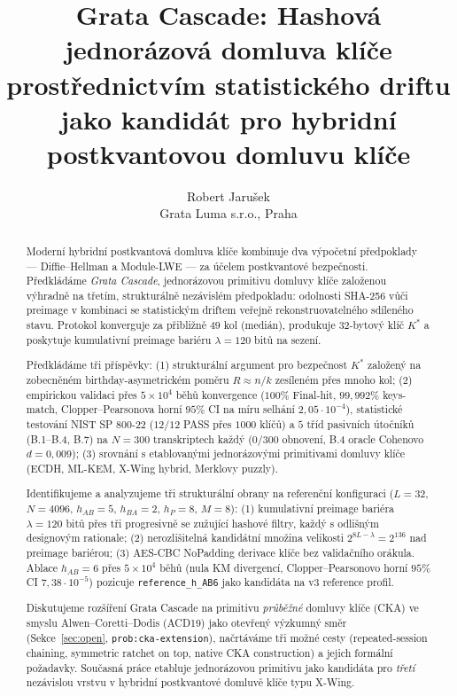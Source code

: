\documentclass[11pt,a4paper]{article}
\title{Grata Cascade: Hashová jednorázová domluva klíče\\
prostřednictvím statistického driftu\\
\large jako kandidát pro hybridní postkvantovou domluvu klíče}
\author{Robert Jarušek\\Grata Luma s.r.o., Praha}
\date{}
\begin{document}
\maketitle

\begin{abstract}
Moderní hybridní postkvantová domluva klíče kombinuje dva výpočetní předpoklady --- Diffie--Hellman a Module-LWE --- za účelem postkvantové bezpečnosti. Předkládáme \emph{Grata Cascade}, jednorázovou primitivu domluvy klíče založenou výhradně na třetím, strukturálně nezávislém předpokladu: odolnosti SHA-256 vůči preimage v kombinaci se statistickým driftem veřejně rekonstruovatelného sdíleného stavu. Protokol konverguje za přibližně $49$ kol (medián), produkuje 32-bytový klíč $K^*$ a poskytuje kumulativní preimage bariéru $\lambda = 120$ bitů na sezení.

Předkládáme tři příspěvky: (1) strukturální argument pro bezpečnost $K^*$ založený na zobecněném birthday-asymetrickém poměru $R \approx n/k$ zesíleném přes mnoho kol; (2) empirickou validaci přes $5 \times 10^4$ běhů konvergence ($100\%$ Final-hit, $99{,}992\%$ keys-match, Clopper--Pearsonova horní $95\%$ CI na míru selhání $2{,}05 \cdot 10^{-4}$), statistické testování NIST SP 800-22 ($12/12$ PASS přes $1000$ klíčů) a $5$ tříd pasivních útočníků (B.1--B.4, B.7) na $N=300$ transkriptech každý ($0/300$ obnovení, B.4 oracle Cohenovo $d = 0{,}009$); (3) srovnání s etablovanými jednorázovými primitivami domluvy klíče (ECDH, ML-KEM, X-Wing hybrid, Merklovy puzzly).

Identifikujeme a analyzujeme tři strukturální obrany na referenční konfiguraci ($L = 32$, $N = 4096$, $h_{AB} = 5$, $h_{BA} = 2$, $h_P = 8$, $M = 8$): (1) kumulativní preimage bariéra $\lambda = 120$ bitů přes tři progresivně se zužující hashové filtry, každý s odlišným designovým rationale; (2) nerozlišitelná kandidátní množina velikosti $2^{8L - \lambda} = 2^{136}$ nad preimage bariérou; (3) AES-CBC NoPadding derivace klíče bez validačního orákula. Ablace $h_{AB} = 6$ přes $5 \times 10^4$ běhů (nula KM divergencí, Clopper--Pearsonovo horní $95\%$ CI $7{,}38 \cdot 10^{-5}$) pozicuje \texttt{reference\_h\_AB6} jako kandidáta na v3 reference profil.

Diskutujeme rozšíření Grata Cascade na primitivu \emph{průběžné} domluvy klíče (CKA) ve smyslu Alwen--Coretti--Dodis (ACD19) jako otevřený výzkumný směr (Sekce~\ref{sec:open}, \texttt{prob:cka-extension}), načrtáváme tři možné cesty (repeated-session chaining, symmetric ratchet on top, native CKA construction) a jejich formální požadavky. Současná práce etabluje jednorázovou primitivu jako kandidáta pro \emph{třetí} nezávislou vrstvu v hybridní postkvantové domluvě klíče typu X-Wing.
\end{abstract}
\end{document}
